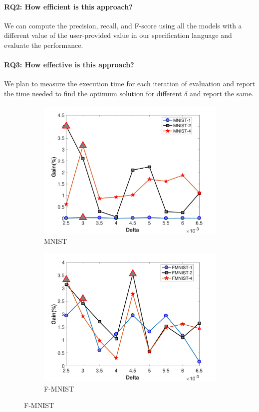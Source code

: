 \paragraph{\textbf{RQ2: How efficient is this approach?}}
We can compute the precision, recall, and F-score using all the models with a different value of the user-provided value in our specification language and evaluate the performance.
\paragraph{\textbf{RQ3: How effective is this approach?}}
We plan to measure the execution time for each iteration of evaluation and report the time needed to find the optimum solution for different $\delta$ and report the same.
\begin{figure}
	\begin{subfigure}[b]{.46\linewidth}{}
		\includegraphics[keepaspectratio = True, scale = 0.31]{figures/MNIST_Delta}
		\centering
		\caption{MNIST}
		\vspace{2.0em}
	\end{subfigure}
	\begin{subfigure}[b]{.46\linewidth}
		\includegraphics[keepaspectratio = True, scale = 0.31]{figures/FMNIST_Delta}
		\caption{F-MNIST}
		\vspace{2.0em}
	\end{subfigure}
	

\end{figure}

